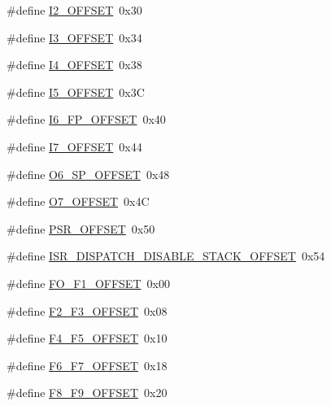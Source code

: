 \begin{DoxyCompactItemize}
\#define \mbox{\hyperlink{group__RTEMSScoreCPUSPARCContext_ga99fecfd868fd9e17e066dd8af10c15d2}{I2\+\_\+\+O\+F\+F\+S\+ET}}~0x30
\item 
\#define \mbox{\hyperlink{group__RTEMSScoreCPUSPARCContext_gafb303f9d9dd81b5721a2c645b1a08984}{I3\+\_\+\+O\+F\+F\+S\+ET}}~0x34
\item 
\#define \mbox{\hyperlink{group__RTEMSScoreCPUSPARCContext_ga466f4de4266c7166c9577e2cbbd297ea}{I4\+\_\+\+O\+F\+F\+S\+ET}}~0x38
\item 
\#define \mbox{\hyperlink{group__RTEMSScoreCPUSPARCContext_gadcfaa9c9eceb787a2a3b3402d0dd3474}{I5\+\_\+\+O\+F\+F\+S\+ET}}~0x3C
\item 
\#define \mbox{\hyperlink{group__RTEMSScoreCPUSPARCContext_gafdd0fc2345b7aa2cc6b92f97a14a3d2d}{I6\+\_\+\+F\+P\+\_\+\+O\+F\+F\+S\+ET}}~0x40
\item 
\#define \mbox{\hyperlink{group__RTEMSScoreCPUSPARCContext_gac7108380e581fae532b795693e1247fb}{I7\+\_\+\+O\+F\+F\+S\+ET}}~0x44
\item 
\#define \mbox{\hyperlink{group__RTEMSScoreCPUSPARCContext_gade171714128eb94279ae25990e74e11f}{O6\+\_\+\+S\+P\+\_\+\+O\+F\+F\+S\+ET}}~0x48
\item 
\#define \mbox{\hyperlink{group__RTEMSScoreCPUSPARCContext_ga67520ea6e8b67a9019cfc4d5efca010f}{O7\+\_\+\+O\+F\+F\+S\+ET}}~0x4C
\item 
\#define \mbox{\hyperlink{group__RTEMSScoreCPUSPARCContext_ga0637b00e9795d211424ca2b03e0c3183}{P\+S\+R\+\_\+\+O\+F\+F\+S\+ET}}~0x50
\item 
\#define \mbox{\hyperlink{group__RTEMSScoreCPUSPARCContext_ga1d8b44870defefae2396681b9532226a}{I\+S\+R\+\_\+\+D\+I\+S\+P\+A\+T\+C\+H\+\_\+\+D\+I\+S\+A\+B\+L\+E\+\_\+\+S\+T\+A\+C\+K\+\_\+\+O\+F\+F\+S\+ET}}~0x54
\item 
\#define \mbox{\hyperlink{group__RTEMSScoreCPUSPARCContext_ga1c954ccb66fecec2e79790c8a07e8e53}{F\+O\+\_\+\+F1\+\_\+\+O\+F\+F\+S\+ET}}~0x00
\item 
\#define \mbox{\hyperlink{group__RTEMSScoreCPUSPARCContext_ga129a289ca8286590f4ac24729438dff4}{F2\+\_\+\+F3\+\_\+\+O\+F\+F\+S\+ET}}~0x08
\item 
\#define \mbox{\hyperlink{group__RTEMSScoreCPUSPARCContext_gad0595daf571b74cecb00e2faacded1e2}{F4\+\_\+\+F5\+\_\+\+O\+F\+F\+S\+ET}}~0x10
\item 
\#define \mbox{\hyperlink{group__RTEMSScoreCPUSPARCContext_ga2e3b5d6f57581dfd11df52e313b24e95}{F6\+\_\+\+F7\+\_\+\+O\+F\+F\+S\+ET}}~0x18
\item 
\#define \mbox{\hyperlink{group__RTEMSScoreCPUSPARCContext_ga7c6536f596d1caee379a306cd0e860f9}{F8\+\_\+\+F9\+\_\+\+O\+F\+F\+S\+ET}}~0x20

\end{DoxyCompactItemize}
